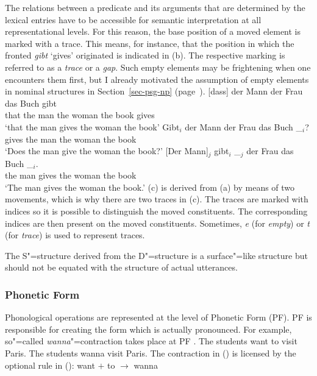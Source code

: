 The relations between a predicate and its arguments that are determined by the lexical entries have to be accessible for semantic interpretation at all 
representational levels. For this reason, the base position of a moved element is marked with a
trace. This means, for instance, that the position in which the
fronted \emph{gibt} `gives' originated is indicated in (b). The respective marking is
referred to as a \emph{trace} or a \emph{gap}. Such empty elements may be
frightening when one encounters them first, but I already motivated the assumption
of empty elements in nominal structures in Section~\ref{sec-psg-np}  (page~\pageref{np-epsilon}). 
\eal
\ex 
\gll {}[dass] der Mann der Frau das Buch gibt\\
	 {}\spacebr{}that the man the woman the book gives\\
\glt `that the man gives the woman the book'
\ex 
\gll Gibt$_i$ der Mann der Frau das Buch \_$_i$?\\
	 gives the man the woman the book\\
\glt `Does the man give the woman the book?'
\ex 
\gll {}[Der Mann]$_j$ gibt$_i$ \_$_j$ der Frau das Buch \_$_i$.\\
	 {}\spacebr{}the man gives {} the woman the book\\
\glt `The man gives the woman the book.'
\zl
(c) is derived from (a) by means of two movements, which is why there are two traces in (c). The traces are marked with
indices so it is possible to distinguish the moved constituents. The corresponding indices are then present on the moved constituents. Sometimes,
\emph{e} (for \emph{empty}) or \emph{t} (for \emph{trace}) is used to represent traces.

The S"=structure derived from the D"=structure is a surface"=like structure but should not be equated with the structure of actual utterances.

\subsubsection{Phonetic Form}

Phonological operations are represented at the level of Phonetic Form (PF). PF is responsible for creating the form which
is actually pronounced. For example, so"=called \emph{wanna}"=contraction takes place at PF \citep[--21]{Chomsky81a}.
\eal
\ex The students want to visit Paris.
\ex The students wanna visit Paris.
\zl
The contraction in () is licensed by the optional rule in ():
\ea
want $+$ to $\to$ wanna
\z
{}

